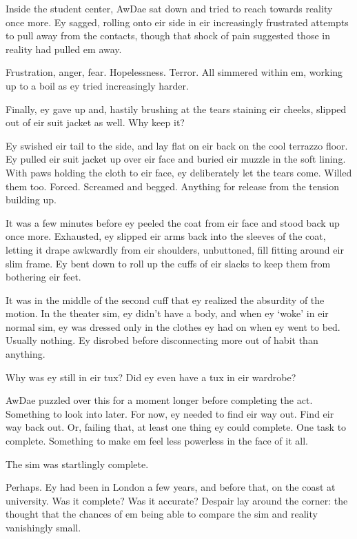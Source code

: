 Inside the student center, AwDae sat down and tried to reach towards reality once more. Ey sagged, rolling onto eir side in eir increasingly frustrated attempts to pull away from the contacts, though that shock of pain suggested those in reality had pulled em away.

Frustration, anger, fear. Hopelessness. Terror. All simmered within em, working up to a boil as ey tried increasingly harder.

Finally, ey gave up and, hastily brushing at the tears staining eir cheeks, slipped out of eir suit jacket as well. Why keep it?

Ey swished eir tail to the side, and lay flat on eir back on the cool terrazzo floor. Ey pulled eir suit jacket up over eir face and buried eir muzzle in the soft lining. With paws holding the cloth to eir face, ey deliberately let the tears come. Willed them too. Forced. Screamed and begged. Anything for release from the tension building up.

It was a few minutes before ey peeled the coat from eir face and stood back up once more. Exhausted, ey slipped eir arms back into the sleeves of the coat, letting it drape awkwardly from eir shoulders, unbuttoned, fill fitting around eir slim frame. Ey bent down to roll up the cuffs of eir slacks to keep them from bothering eir feet.

It was in the middle of the second cuff that ey realized the absurdity of the motion. In the theater sim, ey didn't have a body, and when ey `woke' in eir normal sim, ey was dressed only in the clothes ey had on when ey went to bed. Usually nothing. Ey disrobed before disconnecting more out of habit than anything.

Why was ey still in eir tux? Did ey even have a tux in eir wardrobe?

AwDae puzzled over this for a moment longer before completing the act. Something to look into later. For now, ey needed to find eir way out. Find eir way back out. Or, failing that, at least one thing ey could complete. One task to complete. Something to make em feel less powerless in the face of it all.


The sim was startlingly complete.

Perhaps. Ey had been in London a few years, and before that, on the coast at university. Was it complete? Was it accurate? Despair lay around the corner: the thought that the chances of em being able to compare the sim and reality vanishingly small.

